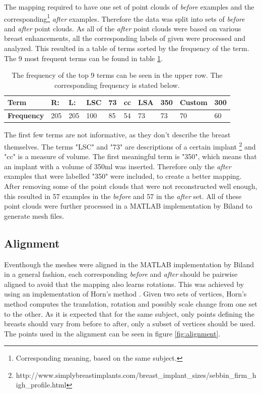 The mapping required to have one set of point clouds of \textit{before} examples and the corresponding\footnote{Corresponding meaning, based on the same subject.} \textit{after} examples. Therefore the data was split into sets of \textit{before} and \textit{after} point clouds. As all of the \textit{after} point clouds were based on various breast enhancements, all the corresponding labels of given were processed and analyzed. This resulted in a table of terms sorted by the frequency of the term. The 9 most frequent terms can be found in table \ref{tableTerms}.

\begin{table}[]
\centering
\begin{tabular}{|l|l|l|l|l|l|l|l|l|l|}
\hline
\textbf{Term}      & \textbf{R:} & \textbf{L:} & \textbf{LSC} & \textbf{73} & \textbf{cc} & \textbf{LSA} & \textbf{350} & \textbf{Custom} & \textbf{300} \\ \hline
\textbf{Frequency} & 205         & 205         & 100          & 85          & 54          & 73           & 73           & 70              & 60           \\ \hline
\end{tabular}
\caption[Table of most frequent terms]{The frequency of the top 9 terms can be seen in the upper row. The corresponding frequency is stated below.}
\label{tableTerms}
\end{table}

The first few terms are not informative, as they don't describe the breast themselves. The terms "LSC" and "73" are descriptions of a certain implant \footnote{http://www.simplybreastimplants.com/breast\_implant\_sizes/sebbin\_firm\_high\_profile.html} and "cc" is a measure of volume. The first meaningful term is "350", which means that an implant with a volume of 350ml was inserted. Therefore only the \textit{after} examples that were labelled "350" were included, to create a better mapping. After removing some of the point clouds that were not reconstructed well enough, this resulted in 57 examples in the \textit{before} and 57 in the \textit{after} set. All of these point clouds were further processed in a MATLAB implementation by Biland \cite{Biland17} to generate mesh files.

\subsection{Alignment}
\label{align}
Eventhough the meshes were aligned in the MATLAB implementation by Biland \cite{Biland17} in a general fashion, each corresponding \textit{before} and \textit{after} should be pairwise aligned to avoid that the mapping also learns rotations. This was achieved by using an implementation of Horn's method \cite{horn1987closed}. Given two sets of vertices, Horn's method computes the translation, rotation and possibly scale change from one set to the other. As it is expected that for the same subject, only points defining the breasts should vary from before to after, only a subset of vertices should be used. The points used in the alignment can be seen in figure \ref{fig:alignment}.

